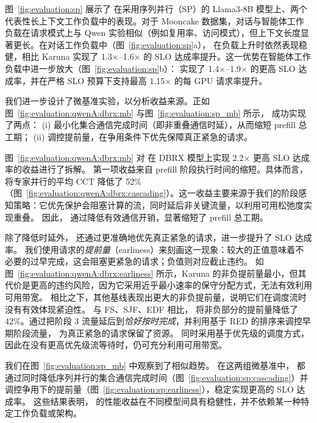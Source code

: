 
图~\ref{fig:evaluation:sp} 展示了 \sys{} 在采用序列并行（SP）的 Llama3-8B 模型上、两个代表性长上下文工作负载中的表现。对于 Mooncake 数据集，对话与智能体工作负载在请求模式上与 Qwen 实验相似（例如复用率、访问模式），但上下文长度显著更长。在对话工作负载中（图~\ref{fig:evaluation:sp}a），\sys{} 在负载上升时依然表现稳健，相比 Karuna 实现了 1.3$\times$--1.6$\times$ 的 SLO 达成率提升。这一优势在智能体工作负载中进一步放大（图~\ref{fig:evaluation:sp}b）：\sys{} 实现了 1.4$\times$--1.9$\times$ 的更高 SLO 达成率，并在严格 SLO 预算下支持最高 1.15$\times$ 的每 GPU 请求率提升。

 我们进一步设计了微基准实验，以分析收益来源。正如图~\ref{fig:evaluation:qwenA:dbrx:mb} 与图~\ref{fig:evaluation:sp_mb} 所示，\sys{} 成功实现了两点：
(i) 最小化集合通信完成时间（即非重叠通信时延），从而缩短 prefill 总工期；
(ii) 调控提前量，在争用条件下优先保障真正紧急的请求。

图~\ref{fig:evaluation:qwenA:dbrx:mb} 对 \sys{} 在 DBRX 模型上实现 2.2$\times$ 更高 SLO 达成率的收益进行了拆解。
第一项收益来自 prefill 阶段执行时间的缩短。具体而言，\sys{} 将专家并行的平均 CCT 降低了 52\%（图~\ref{fig:evaluation:qwenA:dbrx:cascading}）。这一收益主要来源于我们的阶段感知策略：它优先保护会阻塞计算的流，同时延后非关键流量，以利用可用松弛度实现重叠。
因此，\sys{} 通过降低有效通信开销，显著缩短了 prefill 总工期。




除了降低时延外，\sys{} 还通过更准确地优先真正紧急的请求，进一步提升了 SLO 达成率。
我们使用请求的\emph{提前量}（earliness）来刻画这一现象：较大的正值意味着不必要的过早完成，这会阻塞更紧急的请求；负值则对应截止违约。
如图~\ref{fig:evaluation:qwenA:dbrx:earliness} 所示，Karuna 的非负提前量最小，但其代价是更高的违约风险，因为它采用近乎最小速率的保守分配方式，无法有效利用可用带宽。
相比之下，其他基线表现出更大的非负提前量，说明它们在调度流时没有有效体现紧迫性。
与 FS、SJF、EDF 相比，\sys{} 将非负部分的提前量降低了 42\%。通过把阶段 3 流量延后到\textit{恰好按时完成}，并利用基于 RED 的排序来调控早期阶段流量，\sys{} 为真正紧急的请求保留了资源。\sys{} 同时采用基于优先级的调度方式，因此在没有更高优先级流等待时，仍可充分利用可用带宽。

我们在图~\ref{fig:evaluation:sp_mb} 中观察到了相似趋势。
在这两组微基准中，\sys{} 都通过同时降低序列并行的集合通信完成时间（图~\ref{fig:evaluation:sp:cascading}）并调控争用下的提前量（图~\ref{fig:evaluation:sp:earliness}），稳定实现更高的 SLO 达成率。
这些结果表明，\sys{} 的性能收益在不同模型间具有稳健性，并不依赖某一种特定工作负载或架构。
